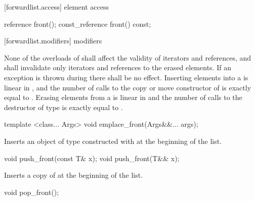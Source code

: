 [forwardlist.access]{ element access}

%
%
\begin{itemdecl}
reference front();
const_reference front() const;
\end{itemdecl}

\begin{itemdescr}
\pnum
\returns {}
\end{itemdescr}

[forwardlist.modifiers]{ modifiers}

\pnum
None of the overloads of  shall affect the validity of iterators and
references, and  shall invalidate only iterators and references to
the erased elements. If an exception is thrown during  there shall
be no effect. Inserting  elements into a  is linear in
, and the number of calls to the copy or move constructor of  is
exactly equal to . Erasing  elements from a  is
linear in  and the number of calls to the destructor of type  is
exactly equal to .

%
%
\begin{itemdecl}
template <class... Args> void emplace_front(Args&&... args);
\end{itemdecl}

\begin{itemdescr}
\pnum
\effects Inserts an object of type  constructed with
 at the beginning of the list.
\end{itemdescr}

%
%
\begin{itemdecl}
void push_front(const T& x);
void push_front(T&& x);
\end{itemdecl}

\begin{itemdescr}
\pnum
\effects Inserts a copy of  at the beginning of the list.
\end{itemdescr}


%
%
\begin{itemdecl}
void pop_front();
\end{itemdecl}


